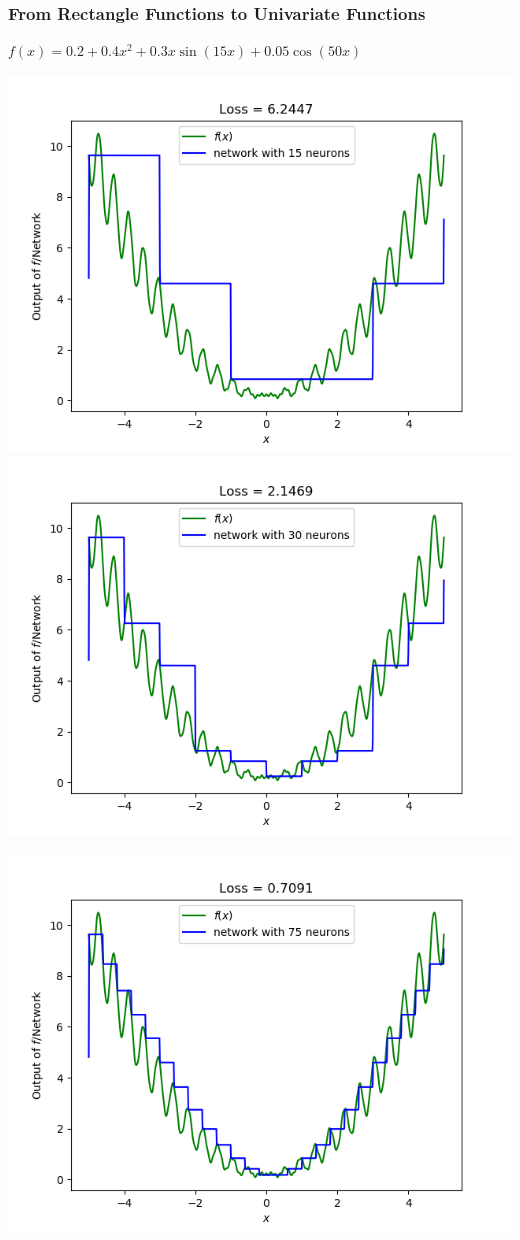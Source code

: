 \documentclass[11pt]{beamer}
\begin{document}
\begin{frame}[t]
\frametitle{From Rectangle Functions to Univariate Functions}
{\small $ f(x) = 0.2 + 0.4 x^2 + 0.3 x \sin(15 x) + 0.05 \cos(50 x)$}
\begin{center}
\includegraphics[scale=0.28]{5IntervalApprox.png}
\includegraphics[scale=0.28]{10IntervalApprox.png}
\end{center}
\vspace{-0.5cm}
\begin{center}
\includegraphics[scale=0.28]{25IntervalApprox.png}

\end{center}
\end{frame}
\end{document}
